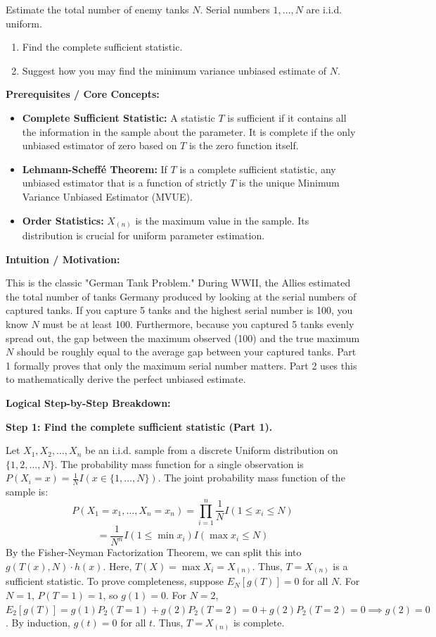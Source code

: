 \begin{exercise}
\label{probability:2013:6}
Estimate the total number of enemy tanks $N$. Serial numbers $1, \dots, N$ are i.i.d. uniform.
\begin{enumerate}
    \item Find the complete sufficient statistic.
    \item Suggest how you may find the minimum variance unbiased estimate of $N$.
\end{enumerate}
\end{exercise}

\begin{solution}
\textbf{Prerequisites / Core Concepts:}
\begin{itemize}
    \item \textbf{Complete Sufficient Statistic:} A statistic $T$ is sufficient if it contains all the information in the sample about the parameter. It is complete if the only unbiased estimator of zero based on $T$ is the zero function itself.
    \item \textbf{Lehmann-Scheffé Theorem:} If $T$ is a complete sufficient statistic, any unbiased estimator that is a function of strictly $T$ is the unique Minimum Variance Unbiased Estimator (MVUE).
    \item \textbf{Order Statistics:} $X_{(n)}$ is the maximum value in the sample. Its distribution is crucial for uniform parameter estimation.
\end{itemize}

\textbf{Intuition / Motivation:}

This is the classic "German Tank Problem." During WWII, the Allies estimated the total number of tanks Germany produced by looking at the serial numbers of captured tanks. If you capture 5 tanks and the highest serial number is 100, you know $N$ must be at least 100. Furthermore, because you captured 5 tanks evenly spread out, the gap between the maximum observed (100) and the true maximum $N$ should be roughly equal to the average gap between your captured tanks. Part 1 formally proves that only the maximum serial number matters. Part 2 uses this to mathematically derive the perfect unbiased estimate.

\textbf{Logical Step-by-Step Breakdown:}

\textbf{Step 1: Find the complete sufficient statistic (Part 1).}

Let $X_1, X_2, \dots, X_n$ be an i.i.d. sample from a discrete Uniform distribution on $\{1, 2, \dots, N\}$.
The probability mass function for a single observation is $P(X_i = x) = \frac{1}{N} I(x \in \{1, \dots, N\})$.
The joint probability mass function of the sample is:
\[ P(X_1=x_1, \dots, X_n=x_n) = \prod_{i=1}^n \frac{1}{N} I(1 \leq x_i \leq N) \]
\[ = \frac{1}{N^n} I(1 \leq \min x_i) I(\max x_i \leq N) \]
By the Fisher-Neyman Factorization Theorem, we can split this into $g(T(x), N) \cdot h(x)$.
Here, $T(X) = \max X_i = X_{(n)}$. Thus, $T = X_{(n)}$ is a sufficient statistic.
To prove completeness, suppose $E_N[g(T)] = 0$ for all $N$.
For $N=1$, $P(T=1) = 1$, so $g(1) = 0$.
For $N=2$, $E_2[g(T)] = g(1)P_2(T=1) + g(2)P_2(T=2) = 0 + g(2)P_2(T=2) = 0 \implies g(2) = 0$.
By induction, $g(t) = 0$ for all $t$. Thus, $T = X_{(n)}$ is complete.


\end{solution}
